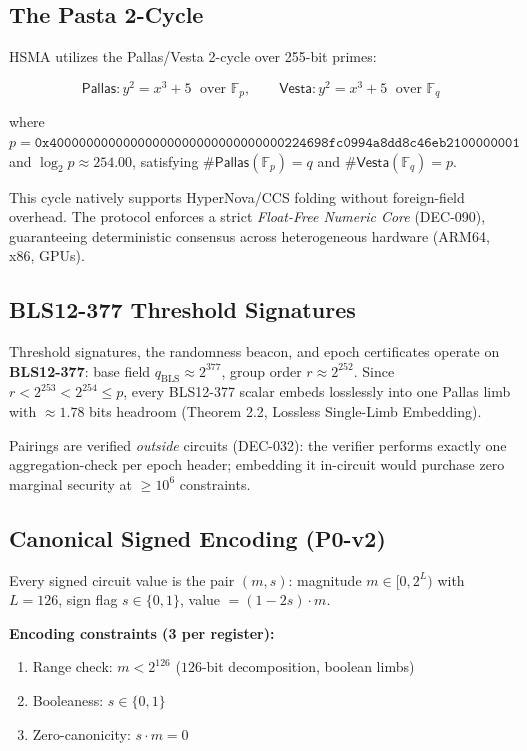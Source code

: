 \documentclass[11pt, a4paper]{article}
\begin{document}
\subsection{The Pasta 2-Cycle}

HSMA utilizes the Pallas/Vesta 2-cycle over 255-bit primes:

\begin{equation}
\textsf{Pallas}: y^2 = x^3 + 5 \;\text{ over } \mathbb{F}_p, \qquad \textsf{Vesta}: y^2 = x^3 + 5 \;\text{ over } \mathbb{F}_q
\end{equation}

where $p = \texttt{0x40000000000000000000000000000000224698fc0994a8dd8c46eb2100000001}$ and $\log_2 p \approx 254.00$, satisfying $\#\textsf{Pallas}(\mathbb{F}_p) = q$ and $\#\textsf{Vesta}(\mathbb{F}_q) = p$.

This cycle natively supports HyperNova/CCS folding without foreign-field overhead. The protocol enforces a strict \textit{Float-Free Numeric Core} (DEC-090), guaranteeing deterministic consensus across heterogeneous hardware (ARM64, x86, GPUs).

\subsection{BLS12-377 Threshold Signatures}

Threshold signatures, the randomness beacon, and epoch certificates operate on \textbf{BLS12-377}: base field $q_{\text{BLS}} \approx 2^{377}$, group order $r \approx 2^{252}$. Since $r < 2^{253} < 2^{254} \le p$, every BLS12-377 scalar embeds losslessly into one Pallas limb with $\approx 1.78$ bits headroom (Theorem 2.2, Lossless Single-Limb Embedding).

Pairings are verified \textit{outside} circuits (DEC-032): the verifier performs exactly one aggregation-check per epoch header; embedding it in-circuit would purchase zero marginal security at $\ge 10^6$ constraints.

\subsection{Canonical Signed Encoding (P0-v2)}

Every signed circuit value is the pair $(m, s)$: magnitude $m \in [0, 2^L)$ with $L = 126$, sign flag $s \in \{0,1\}$, value $= (1-2s) \cdot m$.

\textbf{Encoding constraints (3 per register):}
\begin{enumerate}
    \item Range check: $m < 2^{126}$ ($126$-bit decomposition, boolean limbs)
    \item Booleaness: $s \in \{0, 1\}$     \item Zero-canonicity: $s \cdot m = 0$ \end{enumerate}
\end{document}
